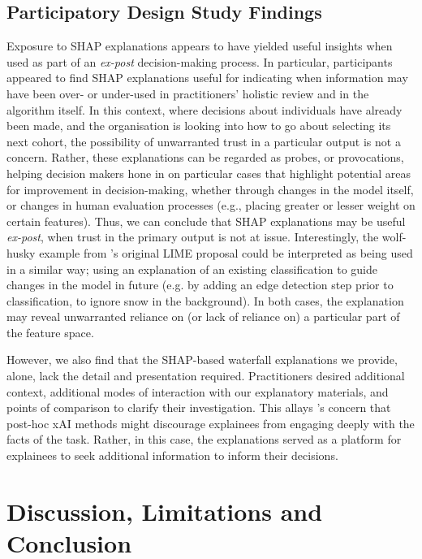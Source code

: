 \subsection{Participatory Design Study Findings}\label{ssec:cs_discussion}
Exposure to SHAP explanations appears to have yielded useful insights when used as part of an \emph{ex-post} decision-making process. In particular, participants appeared to find SHAP explanations useful for indicating when information may have been over- or under-used in practitioners' holistic review and in the algorithm itself. In this context, where decisions about individuals have already been made, and the organisation is looking into how to go about selecting its next cohort, the possibility of unwarranted trust in a particular output is not a concern. Rather, these explanations can be regarded as probes, or provocations, helping decision makers hone in on particular cases that highlight potential areas for improvement in decision-making, whether through changes in the model itself, or changes in human evaluation processes (e.g., placing greater or lesser weight on certain features). Thus, we can conclude that SHAP explanations may be useful \emph{ex-post}, when trust in the primary output is not at issue. Interestingly, the wolf-husky example from \textcite{ribeiro_why_2016}'s original LIME proposal could be interpreted as being used in a similar way; using an explanation of an existing classification to guide changes in the model in future (e.g. by adding an edge detection step prior to classification, to ignore snow in the background). In both cases, the explanation may reveal unwarranted reliance on (or lack of reliance on) a particular part of the feature space.

However, we also find that the SHAP-based waterfall explanations we provide, alone, lack the detail and presentation required. Practitioners desired additional context, additional modes of interaction with our explanatory materials, and points of comparison to clarify their investigation. This allays \textcite{miller_explainable_2023}'s concern that post-hoc xAI methods might discourage explainees from engaging deeply with the facts of the task. Rather, in this case, the explanations served as a platform for explainees to seek additional information to inform their decisions.

\section{Discussion, Limitations and Conclusion}
